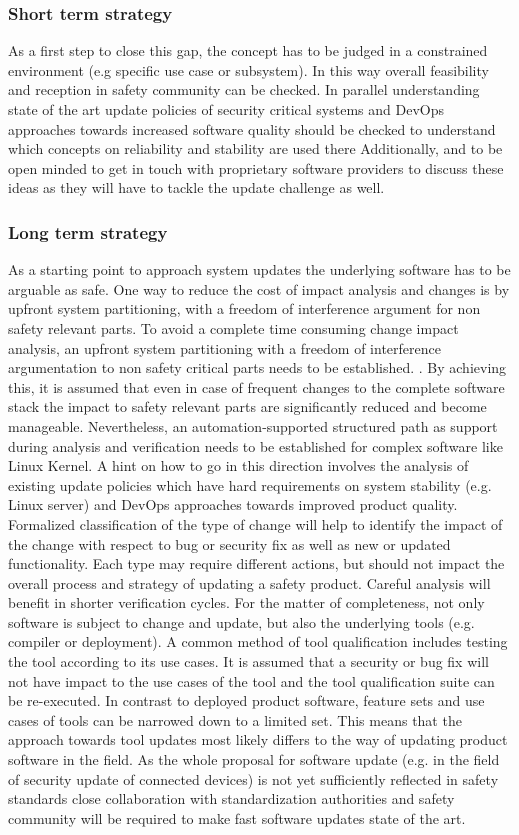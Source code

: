 \documentclass[12pt]{ElisaPaper}
\begin{document}
\subsubsection{Short term strategy}
As a first step to close this gap, the concept has to be judged in a constrained environment (e.g specific use case or subsystem). In this way overall feasibility and reception in safety community can be checked.
In parallel understanding state of the art update policies of security critical systems and DevOps approaches towards increased software quality should be checked to understand which concepts on reliability and stability are used there Additionally, and to be open minded to get in touch with proprietary software providers to discuss these ideas as they will have to tackle the update challenge as well.

\subsubsection{Long term strategy}
As a starting point to approach system updates the underlying software has to be arguable as safe.  
One way to reduce the cost of impact analysis and changes is by upfront system partitioning, with a freedom of interference argument for non safety relevant parts. To avoid a complete time consuming change impact analysis, an upfront system partitioning with a  freedom of interference argumentation to non safety critical parts needs to be established. . By achieving this, it is assumed that even in case of frequent changes to the complete software stack the impact to safety relevant parts are significantly reduced and become manageable. 
Nevertheless, an automation-supported structured path as support during analysis and verification needs to be established for complex software like Linux Kernel. A hint on how to go in this direction involves the analysis of existing update policies which have hard requirements on system stability (e.g. Linux server) and DevOps approaches towards improved product quality. 
Formalized classification of the type of change will help to identify the impact of the change with respect to bug or security fix as well as new or updated functionality. Each type may require different actions, but should not impact the overall process and strategy of updating a safety product. Careful analysis will benefit in shorter verification cycles. 
For the matter of completeness, not only software is subject to change and update, but also the underlying tools (e.g. compiler or deployment). A common method of tool qualification includes testing the tool according to its use cases. It is assumed that a security or bug fix will not have impact to the use cases of the tool and the tool qualification suite can be re-executed. In contrast to deployed product software, feature sets and use cases of tools can be narrowed down to a limited set. This means that the approach towards tool updates most likely differs to the way of updating product software in the field.
As the whole proposal for software update (e.g. in the field of security update of connected devices)  is not yet sufficiently reflected in safety standards close collaboration with standardization authorities and safety community will be required to make fast software updates state of the art.
\end{document}
